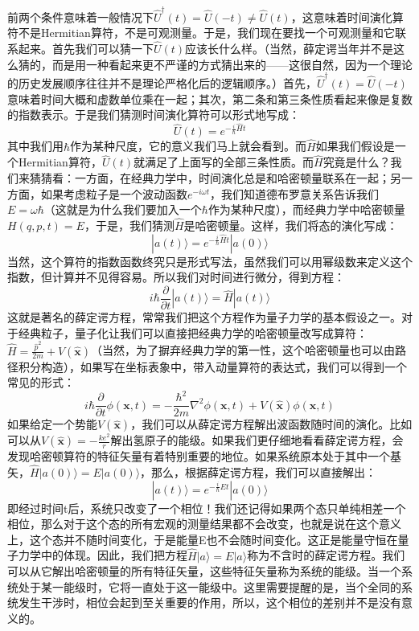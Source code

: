 \documentclass{ctexart}
\begin{document}
前两个条件意味着一般情况下$\hat{U}^\dagger(t)=\hat{U}(-t)\neq\hat{U}(t)$，这意味着时间演化算符不是Hermitian算符，不是可观测量。于是，我们现在要找一个可观测量和它联系起来。首先我们可以猜一下$\hat{U}(t)$应该长什么样。（当然，薛定谔当年并不是这么猜的，而是用一种看起来更不严谨的方式猜出来的——这很自然，因为一个理论的历史发展顺序往往并不是理论严格化后的逻辑顺序。）首先，$\hat{U}^\dagger(t)=\hat{U}(-t)$意味着时间大概和虚数单位乘在一起；其次，第二条和第三条性质看起来像是复数的指数表示。于是我们猜测时间演化算符可以形式地写成：
\begin{equation}
\hat{U}(t)=e^{-\frac{i}{\hbar}\hat{H}t}
\end{equation}
其中我们用$\hbar$作为某种尺度，它的意义我们马上就会看到。而$\hat{H}$如果我们假设是一个Hermitian算符，$\hat{U}(t)$就满足了上面写的全部三条性质。而$\hat{H}$究竟是什么？我们来猜猜看：一方面，在经典力学中，时间演化总是和哈密顿量联系在一起；另一方面，如果考虑粒子是一个波动函数$e^{-i\omega t}$，我们知道德布罗意关系告诉我们$E=\omega\hbar$（这就是为什么我们要加入一个$\hbar$作为某种尺度），而经典力学中哈密顿量$H(q,p,t)=E$，于是，我们猜测$\hat{H}$是哈密顿量。这样，我们将态的演化写成：
\begin{equation}
|a(t)\rangle=e^{-\frac{i}{\hbar}\hat{H}t}|a(0)\rangle
\end{equation}
当然，这个算符的指数函数终究只是形式写法，虽然我们可以用幂级数来定义这个指数，但计算并不见得容易。所以我们对时间进行微分，得到方程：
\begin{equation}
i\hbar\frac{\partial}{\partial t}|a(t)\rangle=\hat{H}|a(t)\rangle
\end{equation}
这就是著名的薛定谔方程，常常我们把这个方程作为量子力学的基本假设之一。对于经典粒子，量子化让我们可以直接把经典力学的哈密顿量改写成算符：$\hat{H}=\frac{\hat{p}^2}{2m}+V(\hat{\bm{x}})$（当然，为了摒弃经典力学的第一性，这个哈密顿量也可以由路径积分构造），如果写在坐标表象中，带入动量算符的表达式，我们可以得到一个常见的形式：
\begin{equation}
i\hbar\frac{\partial}{\partial t}\phi(\bm{x},t)=-\frac{\hbar^2}{2m}\nabla^2\phi(\bm{x},t)+V(\hat{\bm{x}})\phi(\bm{x},t)
\end{equation}
如果给定一个势能$V(\hat{\bm{x}})$，我们可以从薛定谔方程解出波函数随时间的演化。比如可以从$V(\hat{\bm{x}})=-\frac{ke^2}{r}$解出氢原子的能级。如果我们更仔细地看看薛定谔方程，会发现哈密顿算符的特征矢量有着特别重要的地位。如果系统原本处于其中一个基矢，$\hat{H}|a(0)\rangle=E|a(0)\rangle$，那么，根据薛定谔方程，我们可以直接解出：
\begin{equation}
|a(t)\rangle=e^{-\frac{i}{\hbar}Et}|a(0)\rangle
\end{equation}
即经过时间t后，系统只改变了一个相位！我们还记得如果两个态只单纯相差一个相位，那么对于这个态的所有宏观的测量结果都不会改变，也就是说在这个意义上，这个态并不随时间变化，于是能量E也不会随时间变化。这正是能量守恒在量子力学中的体现。因此，我们把方程$\hat{H}|a\rangle=E|a\rangle$称为不含时的薛定谔方程。我们可以从它解出哈密顿量的所有特征矢量，这些特征矢量称为系统的能级。当一个系统处于某一能级时，它将一直处于这一能级中。这里需要提醒的是，当个全同的系统发生干涉时，相位会起到至关重要的作用，所以，这个相位的差别并不是没有意义的。
\end{document}
